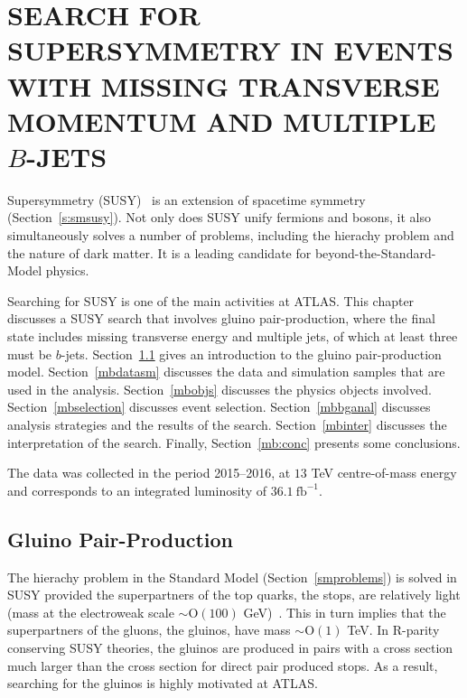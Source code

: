 \chapter{SEARCH FOR SUPERSYMMETRY IN EVENTS WITH MISSING TRANSVERSE MOMENTUM AND
  MULTIPLE $B$-JETS}\label{c:susys}

Supersymmetry
(SUSY)~\cite{Golfand:1971iw,Volkov:1973ix,Wess:1974tw,Wess:1974jb,Ferrara:1974pu,Salam:1974ig}
is an extension of spacetime symmetry (Section~\ref{s:smsusy}). Not only does
SUSY unify fermions and bosons, it also simultaneously solves a number of
problems, including the hierachy problem and the nature of dark matter. It is a
leading candidate for beyond-the-Standard-Model physics.

Searching for SUSY is one of the main activities at ATLAS. This chapter
discusses a SUSY search that involves gluino pair-production, where the final
state includes missing transverse energy and multiple jets, of which at least
three must be $b$-jets. Section~\ref{mbmodel} gives an introduction to the
gluino pair-production model. Section~\ref{mbdatasm} discusses the data and
simulation samples that are used in the analysis. Section~\ref{mbobjs}
discusses the physics objects involved. Section~\ref{mbselection} discusses
event selection. Section~\ref{mbbganal} discusses analysis strategies and the
results of the search. Section~\ref{mbinter} discusses the interpretation of
the search. Finally, Section~\ref{mb:conc} presents some conclusions.


The data was collected in the period 2015--2016, at $13$ TeV centre-of-mass
energy and corresponds to an integrated luminosity of $36.1~\text{fb}^{-1}$.


\section{Gluino Pair-Production}\label{mbmodel}

The hierachy problem in the Standard Model (Section~\ref{smproblems}) is solved
in SUSY provided the superpartners of the top quarks, the stops, are relatively
light (mass at the electroweak scale $\sim \text{O}(100)$
GeV)~\cite{susynatural}. This in turn implies that the superpartners of the
gluons, the gluinos, have mass $\sim \text{O}(1)$ TeV. In R-parity conserving
SUSY theories, the gluinos are produced in pairs with a cross section much
larger than the cross section for direct pair produced stops. As a result,
searching for the gluinos is highly motivated at ATLAS.

